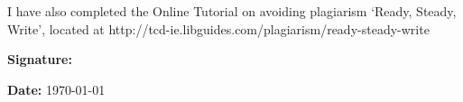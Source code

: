 \documentclass[12pt]{article} %
\begin{document}
	\noindent I have also completed the Online Tutorial on avoiding plagiarism ‘Ready, Steady, Write’, located at http://tcd-ie.libguides.com/plagiarism/ready-steady-write \\
	
	\vspace{.7cm}
	
	
	\begin{flushleft}
		\begin{minipage}{0.5\linewidth}
			\textbf{Signature:}
		\end{minipage}
	\end{flushleft}
	
	\vspace{.3cm}
	
	\noindent \textbf{Date: } \today %
	
\end{document}
